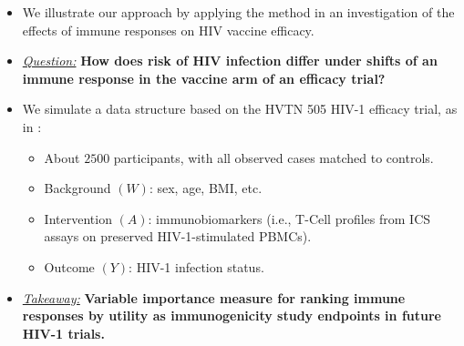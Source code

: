 \documentclass[landscape,a0paper,fontscale=0.285]{baposter} %
\newcommand{\compresslist}{ %
\setlength{\itemsep}{1pt}
\setlength{\parskip}{0pt}
\setlength{\parsep}{0pt}
}
\begin{document}
\begin{poster}
{\begin{itemize}\compresslist
\setlength\itemsep{0.5em}
\item We illustrate our approach by applying the method in an investigation of
  the effects of immune responses on HIV vaccine efficacy.
\item \underline{\textit{Question:}} \textbf{How does risk of HIV infection
   differ under shifts of an immune response in the vaccine arm of an efficacy
   trial?}
\item We simulate a data structure based on the HVTN 505 HIV-1 efficacy trial,
  as in \cite{janes2017higher}:
  \begin{itemize}
    \itemsep0.5pt
    \item About $2500$ participants, with all observed cases matched to
      controls.
    \item Background $(W)$: sex, age, BMI, etc.
    \item Intervention $(A)$: immunobiomarkers (i.e., T-Cell profiles from ICS
      assays on preserved HIV-1-stimulated PBMCs).
    \item Outcome $(Y)$: HIV-1 infection status.
  \end{itemize}
\item \underline{\textit{Takeaway:}} \textbf{Variable importance measure for
   ranking immune responses by utility as immunogenicity study endpoints in
   future HIV-1 trials.}
\end{itemize}
}


\end{poster}
\end{document}
